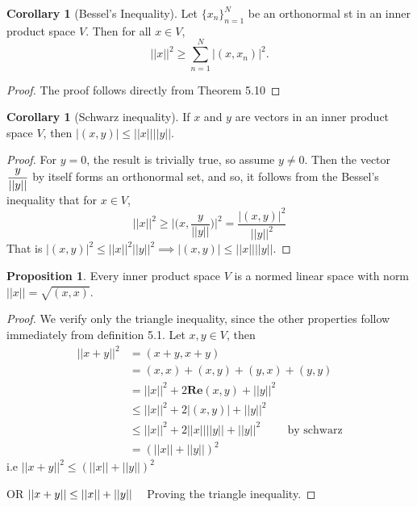 \documentclass[11pt,a4paper]{article}
\theoremstyle{definition}
\newtheorem{prop}[thm]{Proposition}
\newtheorem{coro}[thm]{Corollary}
\begin{document}
\begin{coro}[Bessel's Inequality]
Let $\{x_n\}^{N}_{n=1}$ be an orthonormal st in an inner product space $V$. Then for all $x\in V$, $$||x||^2\geq \sum^N_{n=1}|(x,x_n)|^2.$$
\end{coro}

\begin{proof}
The proof follows directly from Theorem 5.10

\end{proof}


\begin{coro}[Schwarz inequality]
If $x$ and $y$ are vectors in an inner product space $V$, then $|(x,y)|\leq ||x||||y||$.

\end{coro}

\begin{proof}
For $y=0$, the result is trivially true, so assume $y\neq 0$. Then the vector $\large{\dfrac{y}{||y||}}$ by itself forms an orthonormal set, and so, it follows from the Bessel's inequality that for $x\in V$, $$||x||^2\geq \Bigg|\Bigg(x,\frac{y}{||y||}\Bigg)\Bigg|^2=\frac{|(x,y)|^2}{||y||^2}$$ That is \hspace{0.2cm}$|(x,y)|^2\leq ||x||^2||y||^2\implies |(x,y)|\leq ||x||||y||.$
\end{proof}


\begin{prop}
Every inner product space $V$ is a normed linear space with norm\hspace{0.2cm} $||x||=\sqrt{(x,x)}$.


\pagebreak
\end{prop}
\begin{proof}
We verify only the triangle inequality, since the other properties follow immediately from definition 5.1. Let $x,y\in V$, then
\begin{align*}
||x+y||^2 &=(x+y,x+y)\\
          &=(x,x)+(x,y)+(y,x)+(y,y)\\
          &=||x||^2+2\textbf{Re}(x,y)+||y||^2\\
          &\leq ||x||^2+2|(x,y)|+||y||^2\\
          &\leq ||x||^2+2||x||||y||+||y||^2\hspace{1cm} \text{by schwarz}\\
          &=(||x||+||y||)^2
\end{align*} 
i.e $||x+y||^2\leq (||x||+||y||)^2$

OR \hspace{0.3cm}$||x+y||\leq ||x||+||y||\hspace{0.3cm}$ Proving the triangle inequality.

\end{proof}
\end{document}
